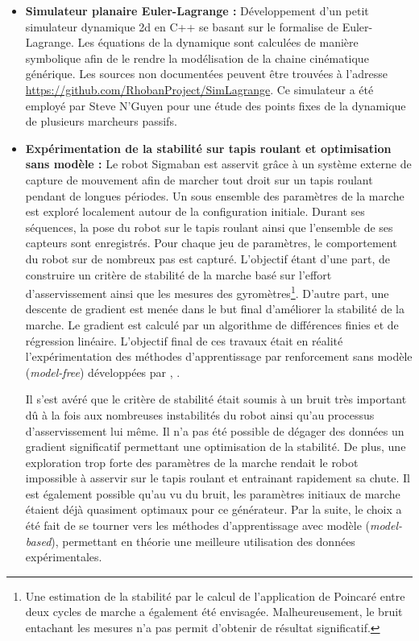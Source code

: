 \begin{itemize}
    \item \textbf{Simulateur planaire Euler-Lagrange : }
        Développement d'un petit simulateur dynamique 2d en C++ 
        se basant sur le formalise de Euler-Lagrange.
        Les équations de la dynamique sont calculées de manière symbolique
        afin de le rendre la modélisation de la chaine cinématique générique.
        Les sources non documentées peuvent être trouvées à l'adresse
        \url{https://github.com/RhobanProject/SimLagrange}.
        Ce simulateur a été employé par Steve N'Guyen pour une étude
        des points fixes de la dynamique de plusieurs marcheurs passifs.\\
    \item \textbf{Expérimentation de la stabilité sur tapis roulant et optimisation sans modèle : }
        Le robot Sigmaban est asservit grâce à un système externe de capture
        de mouvement afin de marcher tout droit sur un tapis roulant pendant 
        de longues périodes.
        Un sous ensemble des paramètres de la marche est exploré localement 
        autour de la configuration initiale.
        Durant ses séquences, la pose du robot sur le tapis roulant ainsi que
        l'ensemble de ses capteurs sont enregistrés.
        Pour chaque jeu de paramètres, le comportement du robot 
        sur de nombreux pas est capturé.
        L'objectif étant d'une part, de construire un critère de stabilité de 
        la marche basé sur l'effort d'asservissement ainsi que les 
        mesures des gyromètres\footnote{Une estimation de la stabilité par le calcul 
        de l'application de Poincaré entre deux cycles de marche a également été envisagée. 
        Malheureusement, le bruit entachant les mesures n'a pas permit d'obtenir 
        de résultat significatif.}.
        D'autre part, une descente de gradient est menée dans le but final d'améliorer 
        la stabilité de la marche.
        Le gradient est calculé par un algorithme de différences finies 
        et de régression linéaire.
        L'objectif final de ces travaux était en réalité l'expérimentation
        des méthodes d'apprentissage par renforcement sans modèle (\textit{model-free})
        développées par \cite{peters_reinforcement_2008}, \cite{kober_policy_2009}.

        Il s'est avéré que le critère de stabilité était soumis à un bruit très important dû 
        à la fois aux nombreuses instabilités du robot ainsi qu'au processus
        d'asservissement lui même.
        Il n'a pas été possible de dégager des données un gradient significatif
        permettant une optimisation de la stabilité.
        De plus, une exploration trop forte des paramètres de la marche rendait le
        robot impossible à asservir sur le tapis roulant et entrainant rapidement sa chute.
        Il est également possible qu'au vu du bruit, les paramètres initiaux 
        de marche étaient déjà quasiment optimaux pour ce générateur.
        Par la suite, le choix a été fait de se tourner vers les méthodes 
        d'apprentissage avec modèle (\textit{model-based}), permettant 
        en théorie une meilleure utilisation des données expérimentales.


\end{itemize}
